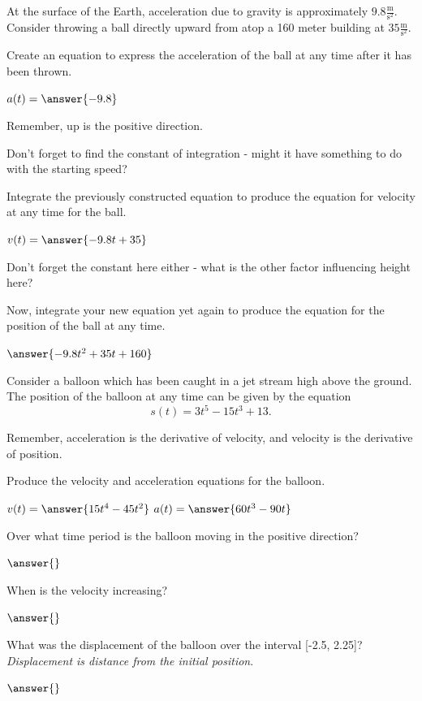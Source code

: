 \documentclass{ximera}
\begin{document}
\begin{question}
At the surface of the Earth, acceleration due to gravity is approximately $9.8 \frac{\text{m}}{\text{s}^2}$. Consider throwing a ball directly upward from atop a 160 meter building at $35 \frac{\text{m}}{\text{s}^2}$.

Create an equation to express the acceleration of the ball at any time after it has been thrown.

$a(t) = \answer{-9.8}$
\begin{feedback}
Remember, up is the positive direction.
\end{feedback}

\begin{hint}
Don't forget to find the constant of integration - might it have something to do with the starting speed?
\end{hint}
Integrate the previously constructed equation to produce the equation for velocity at any time for the ball.

$v(t) = \answer{-9.8t+35}$

\begin{hint}
Don't forget the constant here either - what is the other factor influencing height here?
\end{hint}
Now, integrate your new equation yet again to produce the equation for the position of the ball at any time.

$\answer{-9.8t^2+35t+160}$
\end{question}
\begin{question}
Consider a balloon which has been caught in a jet stream high above the ground. The position of the balloon at any time can be given by the equation $$s(t) = 3t^5-15t^3+13\text{.}$$

\begin{hint}
Remember, acceleration is the derivative of velocity, and velocity is the derivative of position.
\end{hint}
Produce the velocity and acceleration equations for the balloon.

$v(t) = \answer{15t^4-45t^2}$
$a(t) = \answer{60t^3-90t}$

Over what time period is the balloon moving in the positive direction?

$\answer{}$

When is the velocity increasing?

$\answer{}$

What was the displacement of the balloon over the interval [-2.5, 2.25]? \textit{Displacement is distance from the initial position}.

$\answer{}$
\end{question}
\end{document}

